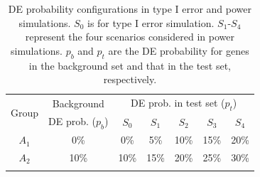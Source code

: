 \documentclass[a4,center,fleqn]{NAR}
\begin{document}
	
	
	
		\begin{table}[!ht]
		\centering
		\caption{DE probability configurations in type I error and power simulations. $S_0$ is for
			type I error simulation. $S_1$-$S_4$ represent the four scenarios considered in power simulations. $p_b$ and $p_t$ are the DE probability for genes in the background set and that in the test set, respectively.}
			
		\begin{tabular}{ccccccc}
			\toprule
			\multirow{2}{*}{Group} & 	Background & \multicolumn{5}{c}{DE prob. in test set ($p_t$)}\\
			&DE prob. ($p_b$)&$S_0$ &$S_1$ &$S_2$ &$S_3$ &$S_4$\\
			\colrule
			$A_1$ & 0\% & 0\%  & 5\% & 10\% & 15\% & 20\%\\ 
			$A_2$ & 10\% & 10\% & 15\%& 20\%& 25\% & 30\%\\  
		\botrule
		\end{tabular}
		
		\label{table:simusetup}
	\end{table}
	
\end{document}
